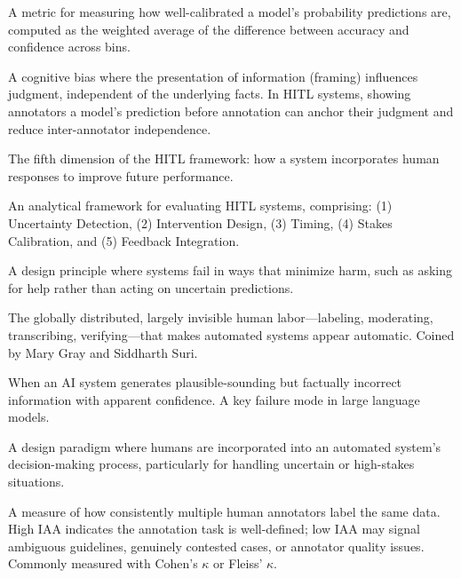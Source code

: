 \begin{description}[style=nextline, leftmargin=2em]
\item[Expected Calibration Error (ECE)]
A metric for measuring how well-calibrated a model's probability predictions are, computed as the weighted average of the difference between accuracy and confidence across bins.

\item[Framing Effect]
A cognitive bias where the presentation of information (framing) influences judgment, independent of the underlying facts. In HITL systems, showing annotators a model's prediction before annotation can anchor their judgment and reduce inter-annotator independence.

\item[Feedback Integration]
The fifth dimension of the HITL framework: how a system incorporates human responses to improve future performance.

\item[Five Dimensions Framework]
An analytical framework for evaluating HITL systems, comprising: (1) Uncertainty Detection, (2) Intervention Design, (3) Timing, (4) Stakes Calibration, and (5) Feedback Integration.

\item[Graceful Degradation]
A design principle where systems fail in ways that minimize harm, such as asking for help rather than acting on uncertain predictions.

\item[Ghost Work]
The globally distributed, largely invisible human labor---labeling, moderating, transcribing, verifying---that makes automated systems appear automatic. Coined by Mary Gray and Siddharth Suri.

\item[Hallucination (AI)]
When an AI system generates plausible-sounding but factually incorrect information with apparent confidence. A key failure mode in large language models.

\item[Human-in-the-Loop (HITL)]
A design paradigm where humans are incorporated into an automated system's decision-making process, particularly for handling uncertain or high-stakes situations.

\item[Inter-Annotator Agreement (IAA)]
A measure of how consistently multiple human annotators label the same data. High IAA indicates the annotation task is well-defined; low IAA may signal ambiguous guidelines, genuinely contested cases, or annotator quality issues. Commonly measured with Cohen's $\kappa$ or Fleiss' $\kappa$.


\end{description}
